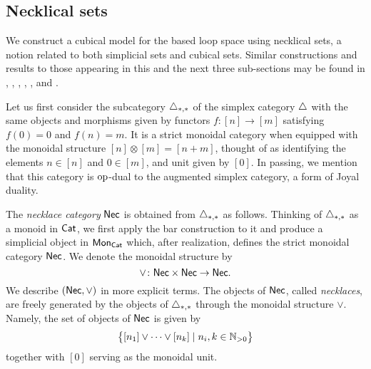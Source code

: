 \subsection{Necklical sets}

We construct a cubical model for the based loop space using necklical sets, a notion related to both simplicial sets and cubical sets.
Similar constructions and results to those appearing in this and the next three sub-sections may be found in \cite{baues1980geometry}, \cite{berger1995loops}, \cite{baues1998hopf}, \cite{dugger2011rigidification}, \cite{galvez2020hopf}, and \cite{rivera2018cubical, rivera2019path}.

Let us first consider the subcategory $\triangle_{*,*}$ of the simplex category $\triangle$ with the same objects and morphisms given by functors $f \colon [n] \to [m]$ satisfying $f(0) = 0$ and $f(n) = m$.
It is a strict monoidal category when equipped with the monoidal structure $[n] \otimes [m] = [n+m]$, thought of as identifying the elements $n \in [n]$ and $0 \in [m]$, and unit given by $[0]$.
In passing, we mention that this category is $\mathrm{op}$-dual to the augmented simplex category, a form of Joyal duality.

The \textit{necklace category} $\mathsf{Nec}$ is obtained from $\triangle_{*,*}$ as follows.
Thinking of $\triangle_{*,*}$ as a monoid in $\mathsf{Cat}$, we first apply the bar construction to it and produce a simplicial object in $\mathsf{Mon}_{\mathsf{Cat}}$ which, after realization, defines the strict monoidal category $\mathsf{Nec}$.
We denote the monoidal structure by
\[
\vee \colon \mathsf{Nec} \times \mathsf{Nec} \to \mathsf{Nec}.
\]
We describe $(\mathsf{Nec}, \vee)$ in more explicit terms.
The objects of $\mathsf{Nec}$, called \textit{necklaces}, are freely generated by the objects of $\triangle_{*,*}$ through the monoidal structure $\vee$.
Namely, the set of objects of $\mathsf{Nec}$ is given by
\[
\big\{ [n_1] \vee \dots \vee[n_k] \mid n_i, k \in \mathbb{N}_{>0} \big\}
\]
together with $[0]$ serving as the monoidal unit.

